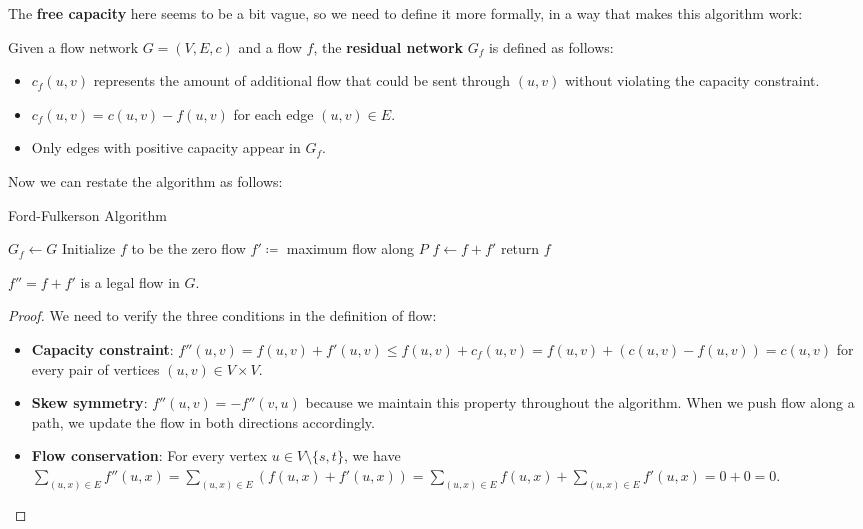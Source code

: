 The \textbf{free capacity} here seems to be a bit vague, so we need to define it more formally, in a way that makes this algorithm work:

\begin{definition}
	Given a flow network $G = (V, E, c)$ and a flow $f$, the \textbf{residual network} $G_f$ is defined as follows:
	\begin{itemize}
		\item $c_f(u,v)$ represents the amount of additional flow that could be sent through $(u,v)$ without violating the capacity constraint.
		\item $c_f(u, v) = c(u, v) - f(u, v)$ for each edge $(u, v) \in E$.
		\item Only edges with positive capacity appear in $G_f$.
	\end{itemize}
\end{definition}

Now we can restate the algorithm as follows:

\begin{algorithm}[H]
	\caption{Ford-Fulkerson Algorithm}
	$G_f \gets G$\;
	Initialize $f$ to be the zero flow\;
	{
		$f' \coloneqq $ maximum flow along $P$\;
		$f \gets f + f'$\;
	}
	return $f$\;
\end{algorithm}

\begin{lemma}
	$f'' = f + f'$ is a legal flow in $G$.
\end{lemma}

\begin{proof}
	We need to verify the three conditions in the definition of flow:
	\begin{itemize}
		\item \textbf{Capacity constraint}: $f''(u,v) = f(u,v)+ f'(u,v)\le f(u,v) + c_f(u,v) = f(u,v) + (c(u,v) - f(u,v)) = c(u,v)$ for every pair of vertices $(u, v) \in V\times V$.
		\item \textbf{Skew symmetry}: $f''(u, v) = -f''(v, u)$ because we maintain this property throughout the algorithm. When we push flow along a path, we update the flow in both directions accordingly.
		\item \textbf{Flow conservation}: For every vertex $u \in V\setminus\{s, t\}$, we have $\sum_{(u,x) \in E} f''(u, x) = \sum_{(u,x) \in E} (f(u, x) + f'(u, x)) = \sum_{(u,x) \in E} f(u, x) + \sum_{(u,x) \in E} f'(u, x) = 0 + 0 = 0$.
	\end{itemize}
\end{proof}


